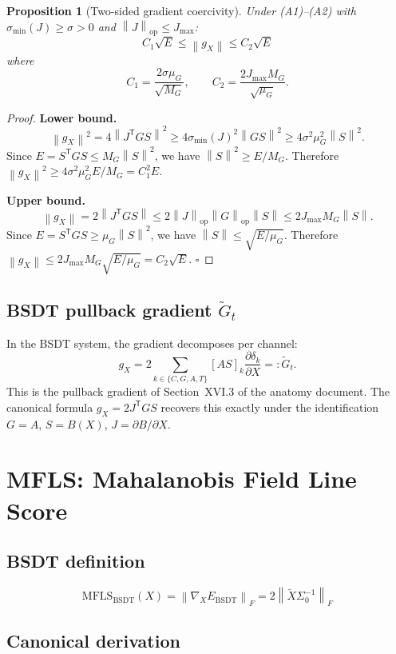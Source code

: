 \documentclass[11pt,a4paper]{article}
\newtheorem{proposition}[theorem]{Proposition}
\theoremstyle{definition}
\newcommand{\T}{^{\mathsf{T}}}
\newcommand{\norm}[1]{\left\|#1\right\|}
\newcommand{\gX}{g_X}
\newcommand{\mfls}{\mathrm{MFLS}}
\newcommand{\bsdt}{\mathrm{BSDT}}
\begin{document}
\begin{proposition}[Two-sided gradient coercivity]
Under (A1)--(A2) with $\sigma_{\min}(J) \geq \sigma > 0$ and
$\norm{J}_\mathrm{op} \leq J_{\max}$:
\[
C_1 \sqrt{E} \leq \norm{\gX} \leq C_2\sqrt{E}
\]
where
\[
C_1 = \frac{2\sigma\mu_G}{\sqrt{M_G}}, \qquad C_2 = \frac{2J_{\max} M_G}{\sqrt{\mu_G}}.
\]
\end{proposition}

\begin{proof}
\textbf{Lower bound.}
\[
\norm{\gX}^2 = 4\norm{J\T GS}^2
\geq 4\sigma_{\min}(J)^2 \norm{GS}^2
\geq 4\sigma^2 \mu_G^2 \norm{S}^2.
\]
Since $E = S\T G S \leq M_G\norm{S}^2$, we have $\norm{S}^2 \geq E/M_G$.
Therefore $\norm{\gX}^2 \geq 4\sigma^2\mu_G^2 E/M_G = C_1^2 E$.

\textbf{Upper bound.}
\[
\norm{\gX} = 2\norm{J\T GS} \leq 2\norm{J}_\mathrm{op}\norm{G}_\mathrm{op}\norm{S}
\leq 2J_{\max} M_G \norm{S}.
\]
Since $E = S\T GS \geq \mu_G\norm{S}^2$, we have $\norm{S} \leq \sqrt{E/\mu_G}$.
Therefore $\norm{\gX} \leq 2J_{\max}M_G\sqrt{E/\mu_G} = C_2\sqrt{E}$. $\square$
\end{proof}

\subsection{BSDT pullback gradient $\tilde G_t$}

In the BSDT system, the gradient decomposes per channel:
\[
\gX = 2\sum_{k \in \{C,G,A,T\}} [AS]_k \frac{\partial \delta_k}{\partial X} =: \tilde G_t.
\]
This is the pullback gradient of Section~XVI.3 of the anatomy document.
The canonical formula $\gX = 2J\T GS$ recovers this exactly under the identification
$G = A$, $S = B(X)$, $J = \partial B/\partial X$.

\section{MFLS: Mahalanobis Field Line Score}

\subsection{BSDT definition}

\[
\mfls_\bsdt(X) = \norm{\nabla_X E_\bsdt}_F = 2\norm{\tilde X \Sigma_0^{-1}}_F
\]

\subsection{Canonical derivation}
\end{document}
